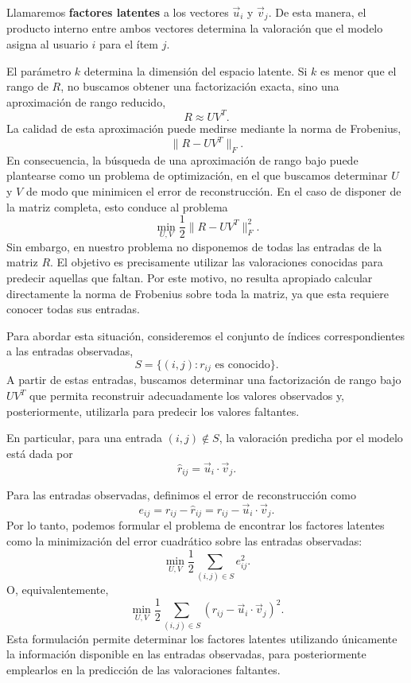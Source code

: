 Llamaremos \textbf{factores latentes} a los vectores $\vec{u}_i$ y $\vec{v}_j$. De esta manera, el producto interno entre ambos vectores determina la valoración que el modelo asigna al usuario $i$ para el ítem $j$.

El parámetro $k$ determina la dimensión del espacio latente. Si $k$ es menor que el rango de $R$, no buscamos obtener una factorización exacta, sino una aproximación de rango reducido,
$$ R\approx UV^T. $$
La calidad de esta aproximación puede medirse mediante la norma de Frobenius,
$$ \|R-UV^T\|_F. $$
En consecuencia, la búsqueda de una aproximación de rango bajo puede plantearse como un problema de optimización, en el que buscamos determinar $U$ y $V$ de modo que minimicen el error de reconstrucción. En el caso de disponer de la matriz completa, esto conduce al problema
$$ \min_{U,V}\frac{1}{2}\|R-UV^T\|_F^2. $$
Sin embargo, en nuestro problema no disponemos de todas las entradas de la matriz $R$. El objetivo es precisamente utilizar las valoraciones conocidas para predecir aquellas que faltan. Por este motivo, no resulta apropiado calcular directamente la norma de Frobenius sobre toda la matriz, ya que esta requiere conocer todas sus entradas.

Para abordar esta situación, consideremos el conjunto de índices correspondientes a las entradas observadas,
$$ S=\{(i,j): r_{ij}\text{ es conocido}\}. $$
A partir de estas entradas, buscamos determinar una factorización de rango bajo $UV^T$ que permita reconstruir adecuadamente los valores observados y, posteriormente, utilizarla para predecir los valores faltantes.

En particular, para una entrada $(i,j)\notin S$, la valoración predicha por el modelo está dada por
$$
\hat r_{ij} = \vec{u}_i\cdot\vec{v}_j. $$

Para las entradas observadas, definimos el error de reconstrucción como
$$ e_{ij} = r_{ij} -\hat r_{ij} = r_{ij}-\vec{u}_i\cdot\vec{v}_j.$$
Por lo tanto, podemos formular el problema de encontrar los factores latentes como la minimización del error cuadrático sobre las entradas observadas:
$$ \min_{U,V} \frac{1}{2} \sum_{(i,j)\in S} e_{ij}^2. $$
O, equivalentemente,
$$ \min_{U,V} \frac{1}{2} \sum_{(i,j)\in S} \left( r_{ij}-\vec{u}_i\cdot\vec{v}_j \right)^2. $$
Esta formulación permite determinar los factores latentes utilizando únicamente la información disponible en las entradas observadas, para posteriormente emplearlos en la predicción de las valoraciones faltantes.

